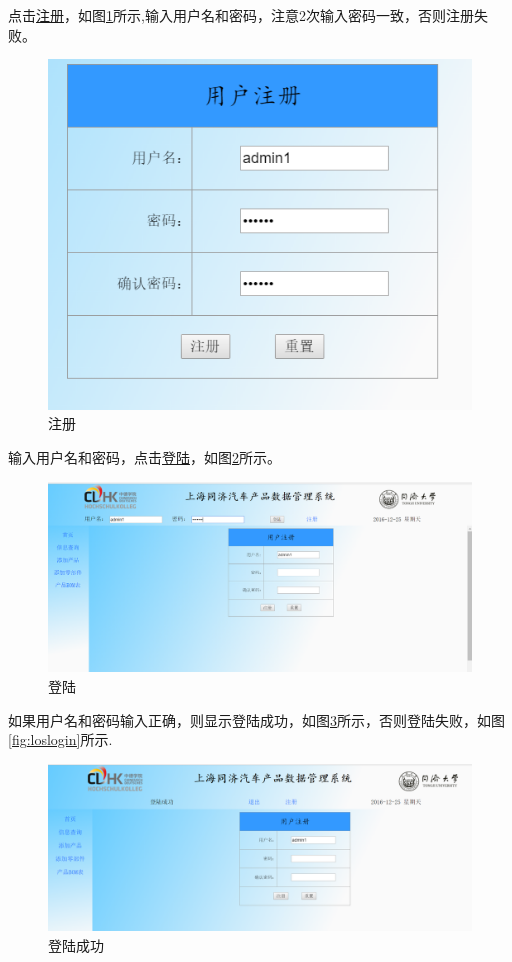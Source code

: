 点击\underline{注册}，如图\ref{fig:reg}所示,输入用户名和密码，注意2次输入密码一致，否则注册失败。
\begin{figure}[H]
\centering
\includegraphics[width=0.8\linewidth]{figure/reg}
\caption{注册}
\label{fig:reg}
\end{figure}

输入用户名和密码，点击\underline{登陆}，如图\ref{fig:printlogin}所示。
\begin{figure}[H]
\centering
\includegraphics[width=0.7\linewidth]{figure/printlogin}
\caption{登陆}
\label{fig:printlogin}
\end{figure}

如果用户名和密码输入正确，则显示登陆成功，如图\ref{fig:sucesslogin}所示，否则登陆失败，如图\ref{fig:loslogin}所示.
\begin{figure}[H]
\centering
\includegraphics[width=0.9\linewidth]{figure/sucesslogin}
\caption{登陆成功}
\label{fig:sucesslogin}
\end{figure}

